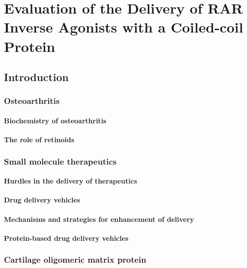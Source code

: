 \chapter{Evaluation of the Delivery of RAR Inverse Agonists with a Coiled-coil
Protein}
\section{Introduction}

\subsection{Osteoarthritis}

\subsubsection{Biochemistry of osteoarthritis}

\subsubsection{The role of retinoids}

\subsection{Small molecule therapeutics}

\subsubsection{Hurdles in the delivery of therapeutics}

\subsubsection{Drug delivery vehicles}

\subsubsection{Mechanisms and strategies for enhancement of delivery}

\subsubsection{Protein-based drug delivery vehicles}

\subsection{Cartilage oligomeric matrix protein}

